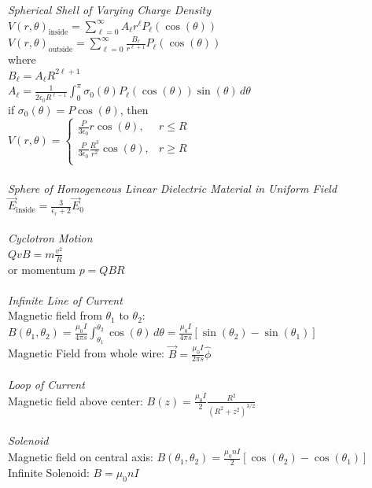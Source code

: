 \documentclass[12pt]{article}
\newcommand{\ds}{\displaystyle}
\begin{document}
\begin{flushleft}
\textit{Spherical Shell of Varying Charge Density}\\
$\ds V(r,\theta)_\text{inside}=\sum_{\ell=0}^\infty A_\ell r^\ell P_\ell(\cos(\theta))$\\
$\ds V(r,\theta)_\text{outside}=\sum_{\ell=0}^\infty\frac{B_\ell}{r^{\ell+1}}P_\ell(\cos(\theta))$\\
where\\
$\ds B_\ell=A_\ell R^{2\ell+1}$\\
$\ds A_\ell=\frac{1}{2\epsilon_0R^{\ell-1}}\int_0^\pi\sigma_0(\theta)P_\ell(\cos(\theta))\sin(\theta)\,d\theta$\\
if $\sigma_0(\theta)=P\cos(\theta)$, then\\
$\ds V(r,\theta)=\begin{cases}
        \ds \frac{P}{3\epsilon_0}r\cos(\theta), & r\leq R\\
        \ds \frac{P}{3\epsilon_0}\frac{R^3}{r^2}\cos(\theta), & r\geq R\\
    \end{cases}$\\~\\

\textit{Sphere of Homogeneous Linear Dielectric Material in Uniform Field}\\
$\ds \vec{E}_\text{inside}=\frac{3}{\epsilon_r+2}\vec{E}_0$\\~\\

\textit{Cyclotron Motion}\\
$\ds QvB=m\frac{v^2}{R}$\\
or momentum $p=QBR$\\~\\

\textit{Infinite Line of Current}\\
Magnetic field from $\theta_1$ to $\theta_2$: $\ds B(\theta_1,\theta_2)=\frac{\mu_0I}{4\pi s}\int_{\theta_1}^{\theta_2}\cos(\theta)\,d\theta=\frac{\mu_0I}{4\pi s}[\sin(\theta_2)-\sin(\theta_1)]$\\
Magnetic Field from whole wire: $\ds\vec{B}=\frac{\mu_0I}{2\pi s}\hat{\phi}$\\~\\

\textit{Loop of Current}\\
Magnetic field above center: $\ds B(z)=\frac{\mu_0I}{2}\frac{R^2}{(R^2+z^2)^{3/2}}$\\~\\

\textit{Solenoid}\\
Magnetic field on central axis: $\ds B(\theta_1,\theta_2)=\frac{\mu_0nI}{2}[\cos(\theta_2)-\cos(\theta_1)]$\\
Infinite Solenoid: $\ds B=\mu_0nI$\\~\\


\end{flushleft}
\end{document}
